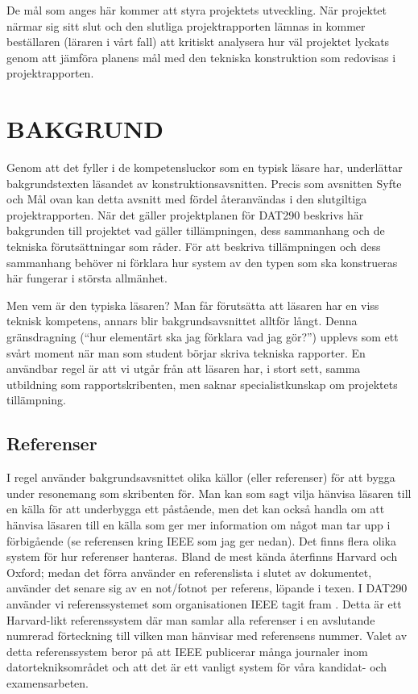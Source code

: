 \documentclass[a4paper]{article}
\begin{document}
De mål som anges här kommer att styra projektets utveckling. När
projektet närmar sig sitt slut och den slutliga projektrapporten lämnas
in kommer beställaren (läraren i vårt fall) att kritiskt analysera hur
väl projektet lyckats genom att jämföra planens mål med den tekniska
konstruktion som redovisas i projektrapporten.



\section{BAKGRUND}
\label{sec:bakgrund}


Genom att det fyller i de kompetensluckor som en typisk läsare har,
underlättar bakgrundstexten läsandet av konstruktionsavsnitten. Precis
som avsnitten Syfte och Mål ovan kan detta avsnitt med fördel
återanvändas i den slutgiltiga projektrapporten. När det gäller
projektplanen för DAT290 beskrivs här bakgrunden till projektet vad
gäller tillämpningen, dess sammanhang och de tekniska förutsättningar
som råder. För att beskriva tillämpningen och dess sammanhang behöver ni
förklara hur system av den typen som ska konstrueras här fungerar i
största allmänhet.

Men vem är den typiska läsaren? Man får förutsätta att läsaren har en
viss teknisk kompetens, annars blir bakgrundsavsnittet alltför långt.
Denna gränsdragning (“hur elementärt ska jag förklara vad jag gör?”)
upplevs som ett svårt moment när man som student börjar skriva tekniska
rapporter. En användbar regel är att vi utgår från att läsaren har, i
stort sett, samma utbildning som rapportskribenten, men saknar
specialistkunskap om projektets tillämpning.


\subsection{Referenser}
\label{sec:referenser}

I regel använder bakgrundsavsnittet olika källor (eller referenser) för
att bygga under resonemang som skribenten för. Man kan som sagt vilja
hänvisa läsaren till en källa för att underbygga ett påstående, men det
kan också handla om att hänvisa läsaren till en källa som ger mer
information om något man tar upp i förbigående (se referensen kring IEEE
som jag ger nedan). Det finns flera olika system för hur referenser
hanteras. Bland de mest kända återfinns Harvard och Oxford; medan det
förra använder en referenslista i slutet av dokumentet, använder det
senare sig av en not/fotnot per referens, löpande i texen. I DAT290
använder vi referenssystemet som organisationen IEEE tagit fram \cite{hughen:2009}. Detta
är ett Harvard-likt referenssystem där man samlar alla referenser i en
avslutande numrerad förteckning till vilken man hänvisar med referensens
nummer. Valet av detta referenssystem beror på att IEEE publicerar många
journaler inom datortekniksområdet och att det är ett vanligt system för
våra kandidat- och examensarbeten.
\end{document}
